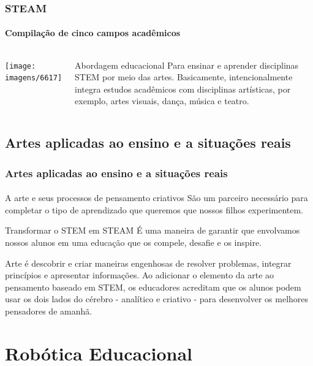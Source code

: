 \documentclass{beamer}
\begin{document}
\begin{frame}
\frametitle{STEAM}
\framesubtitle{Compilação de cinco campos acadêmicos}

\begin{columns}
\begin{flushright}
    \texttt{[image: imagens/6617]}
\end{flushright}


	\begin{block}{Abordagem educacional}
	Para ensinar e aprender disciplinas STEM por meio das artes. Basicamente, intencionalmente integra estudos acadêmicos com disciplinas artísticas, por exemplo, artes visuais, dança, música e teatro.
	\end{block}
	
\end{columns}
\end{frame}

\subsection{Artes aplicadas ao ensino e a situações reais}
\begin{frame}
\frametitle{Artes aplicadas ao ensino e a situações reais}
\framesubtitle{}
	\begin{block}{A arte e seus processos de pensamento criativos}
	São um parceiro necessário para completar o tipo de aprendizado que queremos que nossos filhos experimentem.
	\end{block}

	\begin{block}{Transformar o STEM em STEAM}
	É uma maneira de garantir que envolvamos nossos alunos em uma educação que os compele, desafie e os inspire.
	\end{block}
	
	\begin{block}{Arte é descobrir e criar maneiras engenhosas de resolver problemas, integrar princípios e apresentar informações.}
	Ao adicionar o elemento da arte ao pensamento baseado em STEM, os educadores acreditam que os alunos podem usar os dois lados do cérebro - analítico e criativo - para desenvolver os melhores pensadores de amanhã.
	\end{block}
\end{frame}

\section{Robótica Educacional}
\end{document}
